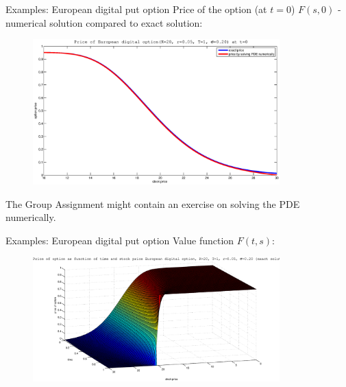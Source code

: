 \documentclass[pdf, handout]{beamer}
\begin{document}
\begin{frame}{Examples: European digital put option}
Price of the option (at $t=0$) $F(s,0)$ - numerical solution compared to exact solution:
\begin{figure}
\includegraphics[width=0.85\textwidth]{startprice_dig_put.eps}
\end{figure}
The Group Assignment might contain an exercise on solving the PDE numerically.
\end{frame}

\begin{frame}{Examples: European digital put option}
Value function $F(t,s)$:
\begin{figure}
\includegraphics[width=0.85\textwidth]{value_dig_put.eps}
\end{figure}
\end{frame}
\end{document}
